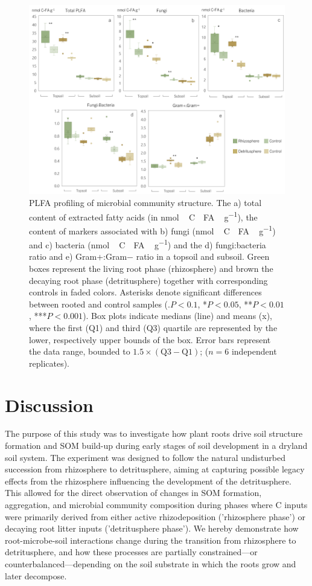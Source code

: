 \begin{figure}[H]
	\centering
	\includegraphics[width=1\textwidth]{img/M5-Figure_3.png}
	\caption{PLFA profiling of microbial community structure. The a) total content of extracted fatty acids (in \si{nmol\,C\text{-}FA\,\gram^{-1}}), the content of markers associated with b) fungi (\si{nmol\,C\text{-}FA\,\gram^{-1}}) and c) bacteria (\si{nmol\,C\text{-}FA\,\gram^{-1}}) and the d) fungi:bacteria ratio and e) Gram+:Gram− ratio in a topsoil and subsoil. Green boxes represent the living root phase (rhizosphere) and brown the decaying root phase (detritusphere) together with corresponding controls in faded colors. Asterisks denote significant differences between rooted and control samples (\(.P < 0.1\), *\(P < 0.05\), **\(P < 0.01\), ***\(P < 0.001\)). Box plots indicate medians (line) and means (x), where the first (Q1) and third (Q3) quartile are represented by the lower, respectively upper bounds of the box. Error bars represent the data range, bounded to \(1.5 \times (\text{Q3}-\text{Q1})\); (\(n = 6\) independent replicates).}
	\label{fig:M5-F3}
\end{figure}

\section{Discussion}

The purpose of this study was to investigate how plant roots drive soil structure formation and SOM build-up during early stages of soil development in a dryland soil system. The experiment was designed to follow the natural undisturbed succession from rhizosphere to detritusphere, aiming at capturing possible legacy effects from the rhizosphere influencing the development of the detritusphere. This allowed for the direct observation of changes in SOM formation, aggregation, and microbial community composition during phases where C inputs were primarily derived from either active rhizodeposition ('rhizosphere phase') or decaying root litter inputs ('detritusphere phase'). We hereby demonstrate how root-microbe-soil interactions change during the transition from rhizosphere to detritusphere, and how these processes are partially constrained—or counterbalanced—depending on the soil substrate in which the roots grow and later decompose.

